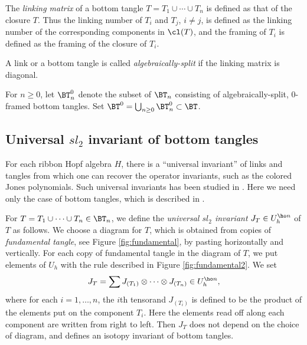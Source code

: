 \documentclass{amsart}
\numberwithin{equation}{section}
\numberwithin{figure}{section}
\theoremstyle{plain}
\theoremstyle{definition}
\theoremstyle{remark}
\begin{document}
The {\em linking matrix} of a bottom tangle $T=T_1\cup \cdots\cup T_n$ is
defined as that of the closure $T$.  Thus the linking number of $T_i$
and $T_j$, $i\neq j$, is defined as the linking number of the
corresponding components in $\cl(T)$, and the framing of $T_i$ is
defined as the framing of the closure of $T_i$.

A link or a bottom tangle is called {\em algebraically-split} if the
linking matrix is diagonal.

For $n\ge 0$, let $\BT^0_n$ denote the subset of $\BT_n$ consisting of
algebraically-split, $0$-framed bottom tangles.  Set
$\BT^0=\bigcup_{n\ge 0}\BT^0_n\subset \BT$.

\subsection{Universal $sl_2$ invariant of bottom tangles}
\label{sec:univ-sl2-invar}

For each ribbon Hopf algebra $H$, there is a ``universal invariant''
of links and tangles from which one can recover the operator
invariants, such as the colored Jones polynomials.  Such universal
invariants has been studied in
\cite{Lawrence:89,Lawrence:90,Reshetikhin:89,Lee:90,Ohtsuki:93,Kauffman:93,Kerler:97,Kauffman-Radford:01}.
Here we need only the case of bottom tangles, which is described in
\cite{H:universal}.

For $T=T_1\cup \cdots\cup T_n\in \BT_n$, we define the {\em universal $sl_2$
  invariant} $J_T\in U_h^{\ho n}$ of $T$ as follows.  We choose a
  diagram for $T$, which is obtained from copies of {\em fundamental
  tangle}, see Figure \ref{fig:fundamental}, by pasting horizontally
  and vertically.
%
%
For each copy of fundamental tangle in the diagram of $T$, we put
elements of $U_h$ with the rule described in Figure
\ref{fig:fundamental2}.
%
%
We set
\begin{equation*}
  J_T =\sum J_{(T_1)}\otimes \cdots\otimes J_{(T_n)}\in U_h^{\ho n},
\end{equation*}
where for each $i=1,\ldots,n$, the $i$th tensorand $J_{(T_i)}$ is defined
to be the product of the elements put on the component $T_i$.  Here
the elements read off along each component are written from right to
left.  Then $J_T$ does not depend on the choice of diagram, and
defines an isotopy invariant of bottom tangles.
\end{document}
